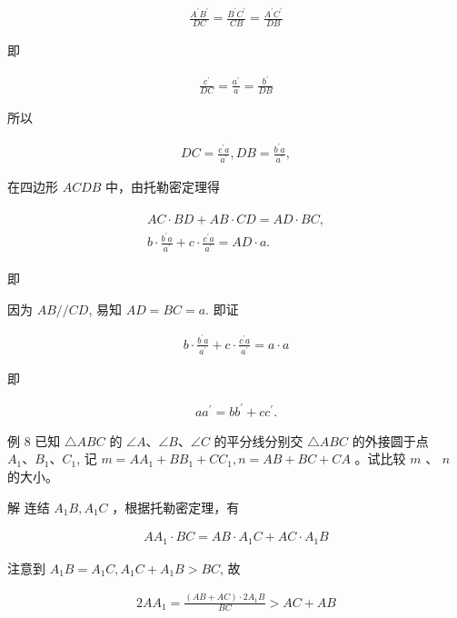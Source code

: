 \documentclass[10pt]{article}
\begin{document}
\begin{align*}
\frac{A^{\prime} B^{\prime}}{D C}=\frac{B^{\prime} C^{\prime}}{C B}=\frac{A^{\prime} C^{\prime}}{D B}
\end{align*}

即

\begin{align*}
\frac{c^{\prime}}{D C}=\frac{a^{\prime}}{a}=\frac{b^{\prime}}{D B}
\end{align*}

所以

\begin{align*}
D C=\frac{c^{\prime} a}{a^{\prime}}, D B=\frac{b^{\prime} a}{a^{\prime}},
\end{align*}

在四边形 $A C D B$ 中，由托勒密定理得

\begin{align*}
\begin{gathered}
A C \cdot B D+A B \cdot C D=A D \cdot B C, \\
b \cdot \frac{b^{\prime} a}{a^{\prime}}+c \cdot \frac{c^{\prime} a}{a^{\prime}}=A D \cdot a .
\end{gathered}
\end{align*}

即

因为 $A B / / C D$, 易知 $A D=B C=a$. 即证

\begin{align*}
b \cdot \frac{b^{\prime} a}{a^{\prime}}+c \cdot \frac{c^{\prime} a}{a^{\prime}}=a \cdot a
\end{align*}

即

\begin{align*}
a a^{\prime}=b b^{\prime}+c c^{\prime} .
\end{align*}

例 8 已知 $\triangle A B C$ 的 $\angle A 、 \angle B 、 \angle C$ 的平分线分别交 $\triangle A B C$ 的外接圆于点 $A_{1} 、 B_{1} 、 C_{1}$, 记 $m=A A_{1}+B B_{1}+C C_{1}, n=A B+B C+C A$ 。试比较 $m$ 、 $n$ 的大小。

解 连结 $A_{1} B, A_{1} C$ ，根据托勒密定理，有

\begin{align*}
A A_{1} \cdot B C=A B \cdot A_{1} C+A C \cdot A_{1} B
\end{align*}

注意到 $A_{1} B=A_{1} C, A_{1} C+A_{1} B>B C$, 故

\begin{align*}
2 A A_{1}=\frac{(A B+A C) \cdot 2 A_{1} B}{B C}>A C+A B
\end{align*}
\end{document}
